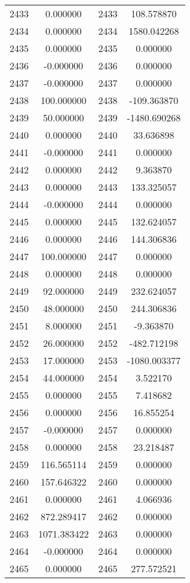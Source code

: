 \documentclass[12pt]{article}
\begin{document}
\begin{longtable}{@{}cccc@{}}
2433 & 0.000000 & 2433 & 108.578870 \\
2434 & 0.000000 & 2434 & 1580.042268 \\
2435 & 0.000000 & 2435 & 0.000000 \\
2436 & -0.000000 & 2436 & 0.000000 \\
2437 & -0.000000 & 2437 & 0.000000 \\
2438 & 100.000000 & 2438 & -109.363870 \\
2439 & 50.000000 & 2439 & -1480.690268 \\
2440 & 0.000000 & 2440 & 33.636898 \\
2441 & -0.000000 & 2441 & 0.000000 \\
2442 & 0.000000 & 2442 & 9.363870 \\
2443 & 0.000000 & 2443 & 133.325057 \\
2444 & -0.000000 & 2444 & 0.000000 \\
2445 & 0.000000 & 2445 & 132.624057 \\
2446 & 0.000000 & 2446 & 144.306836 \\
2447 & 100.000000 & 2447 & 0.000000 \\
2448 & 0.000000 & 2448 & 0.000000 \\
2449 & 92.000000 & 2449 & 232.624057 \\
2450 & 48.000000 & 2450 & 244.306836 \\
2451 & 8.000000 & 2451 & -9.363870 \\
2452 & 26.000000 & 2452 & -482.712198 \\
2453 & 17.000000 & 2453 & -1080.003377 \\
2454 & 44.000000 & 2454 & 3.522170 \\
2455 & 0.000000 & 2455 & 7.418682 \\
2456 & 0.000000 & 2456 & 16.855254 \\
2457 & -0.000000 & 2457 & 0.000000 \\
2458 & 0.000000 & 2458 & 23.218487 \\
2459 & 116.565114 & 2459 & 0.000000 \\
2460 & 157.646322 & 2460 & 0.000000 \\
2461 & 0.000000 & 2461 & 4.066936 \\
2462 & 872.289417 & 2462 & 0.000000 \\
2463 & 1071.383422 & 2463 & 0.000000 \\
2464 & -0.000000 & 2464 & 0.000000 \\
2465 & 0.000000 & 2465 & 277.572521 \\

\end{longtable}
\end{document}
